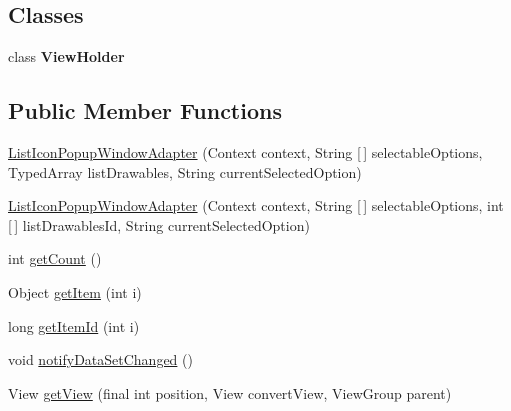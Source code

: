 \subsection*{Classes}
\begin{DoxyCompactItemize}
\item 
class {\bfseries View\+Holder}
\end{DoxyCompactItemize}
\subsection*{Public Member Functions}
\begin{DoxyCompactItemize}
\item 
\hyperlink{classandroid_1_1app_1_1printerapp_1_1util_1_1ui_1_1_list_icon_popup_window_adapter_ab2c300edf3a1f6c944bfc5375c7d4c4c}{List\+Icon\+Popup\+Window\+Adapter} (Context context, String \mbox{[}$\,$\mbox{]} selectable\+Options, Typed\+Array list\+Drawables, String current\+Selected\+Option)
\item 
\hyperlink{classandroid_1_1app_1_1printerapp_1_1util_1_1ui_1_1_list_icon_popup_window_adapter_a28c06da2f8eacfc1029ead85f39548d8}{List\+Icon\+Popup\+Window\+Adapter} (Context context, String \mbox{[}$\,$\mbox{]} selectable\+Options, int \mbox{[}$\,$\mbox{]} list\+Drawables\+Id, String current\+Selected\+Option)
\item 
int \hyperlink{classandroid_1_1app_1_1printerapp_1_1util_1_1ui_1_1_list_icon_popup_window_adapter_acaf78389e61c9bbb11f73572452a79f5}{get\+Count} ()
\item 
Object \hyperlink{classandroid_1_1app_1_1printerapp_1_1util_1_1ui_1_1_list_icon_popup_window_adapter_adf91b9b8a65c90ef02d223951bbc47c5}{get\+Item} (int i)
\item 
long \hyperlink{classandroid_1_1app_1_1printerapp_1_1util_1_1ui_1_1_list_icon_popup_window_adapter_a2bbc6d66343773fa11b7f026f8263b2e}{get\+Item\+Id} (int i)
\item 
void \hyperlink{classandroid_1_1app_1_1printerapp_1_1util_1_1ui_1_1_list_icon_popup_window_adapter_ab0d08442720b06c1ee40fbf3eaf22050}{notify\+Data\+Set\+Changed} ()
\item 
View \hyperlink{classandroid_1_1app_1_1printerapp_1_1util_1_1ui_1_1_list_icon_popup_window_adapter_acec98e2f181b3f3d2422275de7eec793}{get\+View} (final int position, View convert\+View, View\+Group parent)
\end{DoxyCompactItemize}


